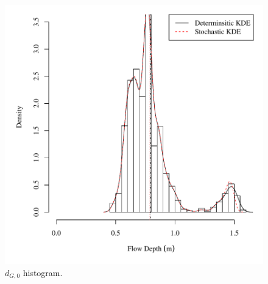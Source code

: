 \begin{center}
\begin{figure}[htbp]
	\includegraphics[width=6in]{"Figures/Results_DSR/V density depthG1"}
	\caption{$d_{G,0}$ histogram.}
\end{figure}
\end{center}
\newpage